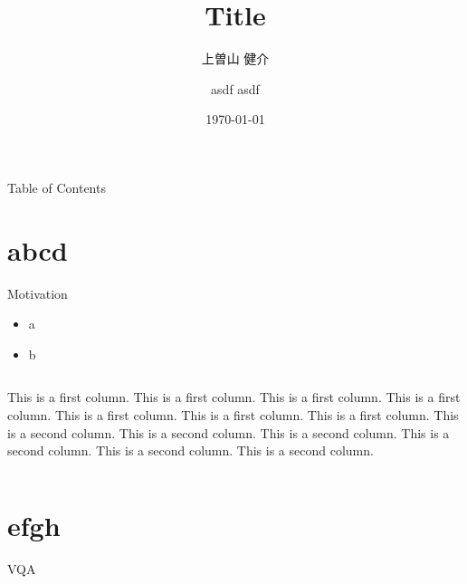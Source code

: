 \documentclass[dvipdfmx,10pt,aspectratio=169]{beamer}
\title{Title}
\author{上曽山 健介\inst{1} \and asdf asdf\inst{2}}
\institute[東京大学]{\inst{1} 東京大学 理学系研究科 物理学専攻 \quad \inst{2} asdf asdf}
\date{\today}
\begin{document}
\frame{\titlepage}




\begin{frame}{Table of Contents}
    \tableofcontents
\end{frame}




\section{abcd}

\begin{frame}{Motivation}
    \begin{itemize}
        \item a
        \item b
    \end{itemize}
\end{frame}




\begin{frame}
    \begin{columns}
            This is a first column. This is a first column. This is a first column. This is a first column. This is a first column. This is a first column. This is a first column.
            This is a second column. This is a second column. This is a second column. This is a second column. This is a second column. This is a second column.
    \end{columns}
\end{frame}





\section{efgh}

\begin{frame}{VQA}
    \begin{center}
    \end{center}
\end{frame}
\end{document}
